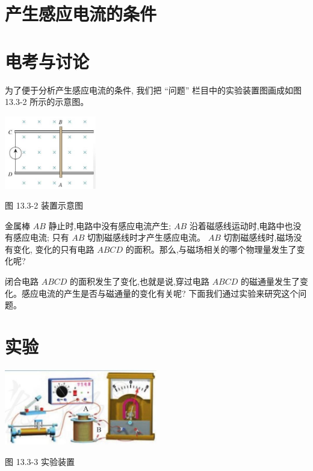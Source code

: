 \documentclass[10pt]{article}
\begin{document}
\section*{产生感应电流的条件}

\section*{电考与讨论}

为了便于分析产生感应电流的条件, 我们把 “问题” 栏目中的实验装置图画成如图 13.3-2 所示的示意图。

\begin{center}
\includegraphics[max width=0.3\textwidth]{images/01911d5f-8e38-70c0-b5b8-2b399bd115b6_120_148978.jpg}
\end{center}

图 13.3-2 装置示意图

金属棒 \({AB}\) 静止时,电路中没有感应电流产生; \({AB}\) 沿着磁感线运动时,电路中也没有感应电流; 只有 \({AB}\) 切割磁感线时才产生感应电流。 \({AB}\) 切割磁感线时,磁场没有变化, 变化的只有电路 \({ABCD}\) 的面积。那么,与磁场相关的哪个物理量发生了变化呢?

闭合电路 \({ABCD}\) 的面积发生了变化,也就是说,穿过电路 \({ABCD}\) 的磁通量发生了变化。感应电流的产生是否与磁通量的变化有关呢? 下面我们通过实验来研究这个问题。

\section*{实验}

\begin{center}
\includegraphics[max width=0.5\textwidth]{images/01911d5f-8e38-70c0-b5b8-2b399bd115b6_120_194995.jpg}
\end{center}

图 13.3-3 实验装置
\end{document}
